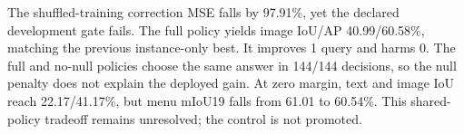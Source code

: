 The shuffled-training correction MSE falls by 97.91\%, yet the declared development gate fails. The full policy yields image IoU/AP 40.99/60.58\%, matching the previous instance-only best. It improves 1 query and harms 0. The full and no-null policies choose the same answer in 144/144 decisions, so the null penalty does not explain the deployed gain. At zero margin, text and image IoU reach 22.17/41.17\%, but menu mIoU19 falls from 61.01 to 60.54\%. This shared-policy tradeoff remains unresolved; the control is not promoted.
